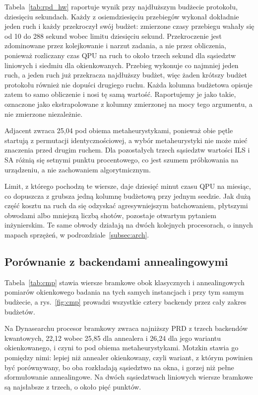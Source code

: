 \documentclass[11pt,a4paper]{article}
\begin{document}
Tabela~\ref{tab:rpd_hw} raportuje wynik przy najdłuższym budżecie protokołu,
dziesięciu sekundach. Każdy z osiemdziesięciu przebiegów wykonał dokładnie
jeden ruch i każdy przekroczył swój budżet: zmierzone czasy przebiegu wahały
się od 10 do 288 sekund wobec limitu dziesięciu sekund. Przekroczenie jest
zdominowane przez kolejkowanie i narzut zadania, a nie przez obliczenia,
ponieważ rozliczany czas QPU na ruch to około trzech sekund dla sąsiedztw
liniowych i siedmiu dla okienkowanych. Przebieg wykonuje co najmniej jeden
ruch, a jeden ruch już przekracza najdłuższy budżet, więc żaden krótszy
budżet protokołu również nie dopuści drugiego ruchu. Każda kolumna budżetowa
opisuje zatem to samo obliczenie i nosi tę samą wartość. Raportujemy je jako
takie, oznaczone jako ekstrapolowane z kolumny zmierzonej na mocy tego
argumentu, a nie zmierzone niezależnie.

Adjacent zwraca 25,04 pod obiema metaheurystykami, ponieważ obie pętle startują
z permutacji identycznościowej, a wybór metaheurystyki nie może mieć znaczenia
przed drugim ruchem. Dla pozostałych trzech sąsiedztw wartości ILS i SA różnią
się setnymi punktu procentowego, co jest szumem próbkowania na urządzeniu,
a nie zachowaniem algorytmicznym.

Limit, z którego pochodzą te wiersze, daje dziesięć minut czasu QPU na
miesiąc, co dopuszcza z grubsza jedną kolumnę budżetową przy jednym seedzie.
Jak dużą część kosztu na ruch da się odzyskać agresywniejszym batchowaniem,
płytszymi obwodami albo mniejszą liczbą shotów, pozostaje otwartym pytaniem
inżynierskim. Te same obwody działają na dwóch kolejnych procesorach, o innych
mapach sprzężeń, w podrozdziale~\ref{subsec:arch}.

\subsection{Porównanie z backendami annealingowymi}
\label{subsec:cmp}
Tabela~\ref{tab:cmp} stawia wiersze bramkowe obok klasycznych
i annealingowych pomiarów okienkowego badania na tych samych instancjach i przy
tym samym budżecie, a rys.~\ref{fig:cmp} prowadzi wszystkie cztery backendy
przez cały zakres budżetów.

Na Dynasearchu procesor bramkowy zwraca najniższy PRD z trzech backendów
kwantowych, 22,12 wobec 25,85 dla annealera i 26,24 dla jego wariantu
okienkowanego, i czyni to pod obiema metaheurystykami. Motzkin stawia go
pomiędzy nimi: lepiej niż annealer okienkowany, czyli wariant, z którym
powinien być porównywany, bo oba rozkładają sąsiedztwo na okna, i gorzej niż
pełne sformułowanie annealingowe. Na dwóch sąsiedztwach liniowych wiersze
bramkowe są najsłabsze z trzech, o około pięć punktów.
\end{document}
